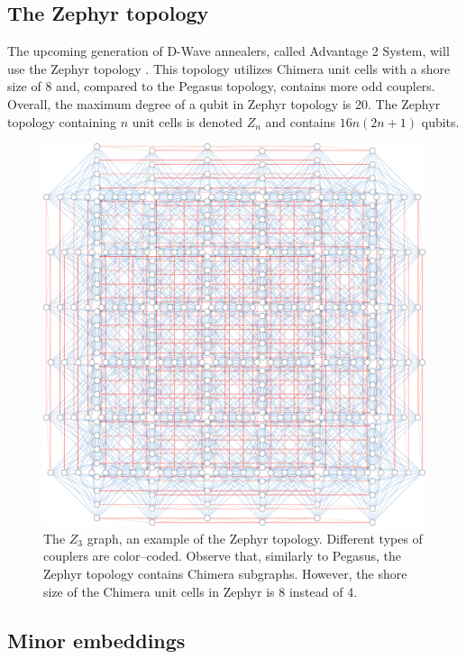 \subsection{The Zephyr topology}
The upcoming generation of D-Wave annealers, called Advantage 2 System, will
use the Zephyr topology \cite{zephyr}. This topology utilizes Chimera unit
cells with a shore size of 8 and, compared to the Pegasus topology, contains
more odd couplers. Overall, the maximum degree of a qubit in Zephyr topology is
20. The Zephyr topology containing $n$ unit cells is denoted $Z_n$ and contains
$16n(2n+1)$ qubits.

\begin{figure}
  \includegraphics[width=\textwidth]{figures/zephyr}
  \caption{
    The $Z_3$ graph, an example of the Zephyr topology. Different types of couplers
    are color--coded. Observe that, similarly to Pegasus, the Zephyr topology
    contains Chimera subgraphs. However, the shore size of the Chimera unit cells
    in Zephyr is 8 instead of 4. } \label{fig:zephyr}
\end{figure}

\subsection{Minor embeddings}

